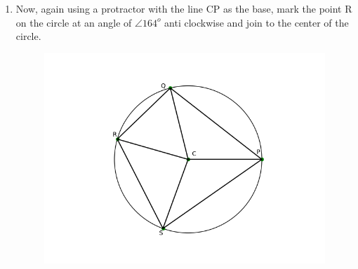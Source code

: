 \documentclass[journal,12pt,twocolumn]{IEEEtran}
\begin{document}
\begin{enumerate}
\begin{figure}[ht]
\end{figure}\\
\item Now, again using a protractor with the line CP as the base, mark the point R on the circle at an angle of $\angle 164^o$ anti clockwise and join to the center of the circle.
\begin{figure}[ht]
    \centering
    \includegraphics[scale = 0.5]{figs/cnstrct_fig3.png}
\end{figure}
\pagebreak


\end{enumerate}
\end{document}
